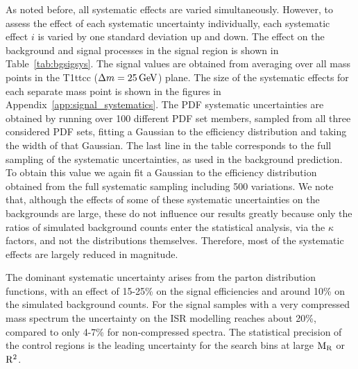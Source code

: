 As noted before, all systematic effects are varied simultaneously. However, to assess the
effect of each systematic uncertainty individually, each systematic effect $i$ is varied by one
standard deviation up and down.  
The effect on the background and signal processes in the signal region is shown in
Table~\ref{tab:bgsigsys}.  
The signal values are obtained from averaging over all mass points in the T1ttcc ($\Delta m =
25\,\text{Ge\hspace{-.08em}V}$) plane.  
The size of the systematic effects for each separate mass point is shown in the figures in 
Appendix~\ref{app:signal_systematics}. 
The PDF systematic uncertainties are obtained by running
over 100 different PDF set members, sampled from all three considered PDF sets, fitting a Gaussian
to the efficiency distribution and taking the
width of that Gaussian.  
The last line in the table corresponds to the full sampling of the systematic uncertainties, as
used in the background prediction. To obtain this value we again fit a Gaussian to the efficiency
distribution obtained from the full systematic sampling including 500 variations.  We note that,
although the effects of some of these systematic uncertainties on the backgrounds are large, these
do not influence our results greatly because only the  ratios of simulated background counts enter
the statistical analysis, via the $\kappa$ factors, and not the distributions themselves. 
Therefore, most of the systematic effects are largely reduced in magnitude. 

The dominant systematic uncertainty arises from the parton distribution functions, with an effect
of 15-25\% on the signal efficiencies and around 10\% on the simulated background counts. For the
signal samples with a very compressed mass spectrum the uncertainty on the ISR modelling reaches
about 20\%, compared to only 4-7\% for non-compressed spectra. 
The statistical precision of the control regions is the leading uncertainty for the search bins at
large $\mathrm{M_R}$ or $\mathrm{R^2}$. 

 

